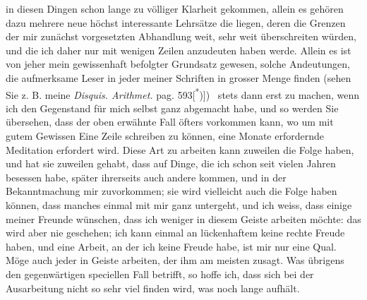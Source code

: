 \clearpage{}
\noindent in diesen Dingen schon lange zu völliger Klarheit gekommen, allein es gehören
dazu mehrere neue höchst interessante Lehrsätze die  liegen, deren
 die Grenzen der mir zunächst vorgesetzten Abhandlung weit,
sehr weit überschreiten würden, und die ich daher  nur mit wenigen
Zeilen anzudeuten haben werde. Allein es ist von jeher mein gewissenhaft
befolgter Grundsatz gewesen, solche Andeutungen, die aufmerksame Leser in
jeder meiner Schriften in grosser Menge finden (sehen Sie z. B. meine \textit{Disquis.
Arithmet.} pag. 593[\textsuperscript{*})])\begingroup\renewcommand{\thefootnote}{}
\endgroup\ stets dann erst zu machen, wenn ich den Gegenstand
für mich selbst ganz abgemacht habe, und so werden Sie übersehen, dass der
oben erwähnte Fall öfters vorkommen kann, wo um mit gutem Gewissen Eine
Zeile schreiben zu können, eine Monate erfordernde Meditation erfordert wird.
Diese Art zu arbeiten kann zuweilen die Folge haben, und hat sie zuweilen
gehabt, dass auf Dinge, die ich schon seit vielen Jahren besessen habe, später
ihrerseits auch andere kommen, und in der Bekanntmachung mir zuvorkommen;
sie wird vielleicht auch die Folge haben können, dass manches einmal mit mir
ganz untergeht, und ich weiss, dass einige meiner Freunde wünschen, dass ich
weniger in diesem Geiste arbeiten möchte: das wird aber nie geschehen; ich
kann einmal an lückenhaftem keine rechte Freude haben, und eine Arbeit,
an der ich keine Freude habe, ist mir nur eine Qual. Möge auch jeder in
 Geiste arbeiten, der ihm am meisten zusagt. Was übrigens den gegenwärtigen
speciellen Fall betrifft, so hoffe ich, dass sich bei der Ausarbeitung
nicht so sehr viel finden wird, was noch lange aufhält.

